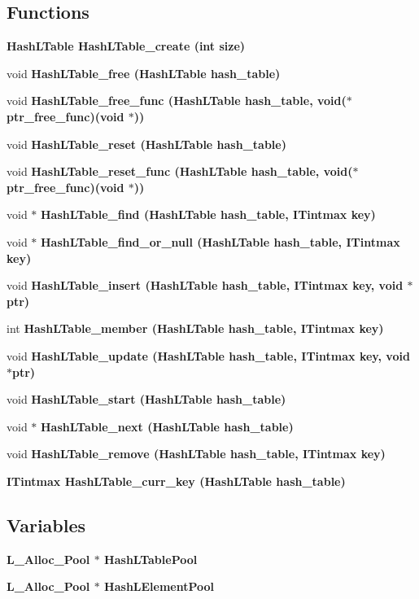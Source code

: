 \subsection*{Functions}
\begin{CompactItemize}
\item 
\bf{Hash\-LTable} \bf{Hash\-LTable\_\-create} (int size)
\item 
void \bf{Hash\-LTable\_\-free} (\bf{Hash\-LTable} hash\_\-table)
\item 
void \bf{Hash\-LTable\_\-free\_\-func} (\bf{Hash\-LTable} hash\_\-table, void($\ast$ptr\_\-free\_\-func)(void $\ast$))
\item 
void \bf{Hash\-LTable\_\-reset} (\bf{Hash\-LTable} hash\_\-table)
\item 
void \bf{Hash\-LTable\_\-reset\_\-func} (\bf{Hash\-LTable} hash\_\-table, void($\ast$ptr\_\-free\_\-func)(void $\ast$))
\item 
void $\ast$ \bf{Hash\-LTable\_\-find} (\bf{Hash\-LTable} hash\_\-table, \bf{ITintmax} key)
\item 
void $\ast$ \bf{Hash\-LTable\_\-find\_\-or\_\-null} (\bf{Hash\-LTable} hash\_\-table, \bf{ITintmax} key)
\item 
void \bf{Hash\-LTable\_\-insert} (\bf{Hash\-LTable} hash\_\-table, \bf{ITintmax} key, void $\ast$ptr)
\item 
int \bf{Hash\-LTable\_\-member} (\bf{Hash\-LTable} hash\_\-table, \bf{ITintmax} key)
\item 
void \bf{Hash\-LTable\_\-update} (\bf{Hash\-LTable} hash\_\-table, \bf{ITintmax} key, void $\ast$ptr)
\item 
void \bf{Hash\-LTable\_\-start} (\bf{Hash\-LTable} hash\_\-table)
\item 
void $\ast$ \bf{Hash\-LTable\_\-next} (\bf{Hash\-LTable} hash\_\-table)
\item 
void \bf{Hash\-LTable\_\-remove} (\bf{Hash\-LTable} hash\_\-table, \bf{ITintmax} key)
\item 
\bf{ITintmax} \bf{Hash\-LTable\_\-curr\_\-key} (\bf{Hash\-LTable} hash\_\-table)
\end{CompactItemize}
\subsection*{Variables}
\begin{CompactItemize}
\item 
\bf{L\_\-Alloc\_\-Pool} $\ast$ \bf{Hash\-LTable\-Pool}
\item 
\bf{L\_\-Alloc\_\-Pool} $\ast$ \bf{Hash\-LElement\-Pool}
\end{CompactItemize}


